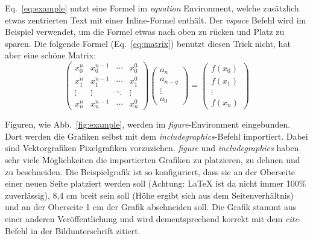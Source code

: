 \documentclass[runningheads,a4paper]{uwsese}
\begin{document}
Eq.~\ref{eq:example} nutzt eine Formel im \emph{equation} Environment, welche zusätzlich etwas zentrierten Text mit einer Inline-Formel enthält. Der \emph{vspace} Befehl wird im Beispiel verwendet, um die Formel etwas nach oben zu rücken und Platz zu sparen. Die folgende Formel (Eq.~\ref{eq:matrix}) benutzt diesen Trick nicht, hat aber eine schöne Matrix:
\begin{equation}
\begin{pmatrix}
x_0^n & x_0^{n-1} & \cdots & x_0^0 \\
x_1^n & x_1^{n-1} & \cdots & x_1^0 \\
\vdots & \vdots & \ddots & \vdots \\
x_n^n & x_n^{n-1} & \cdots & x_n^0
\end{pmatrix}
\begin{pmatrix}
a_n \\
a_{n-q} \\
\vdots\\
a_0
\end{pmatrix}
=
\begin{pmatrix}
f(x_0) \\
f(x_1) \\
\vdots\\
f(x_n)
\end{pmatrix}
\label{eq:matrix}
\end{equation}

Figuren, wie Abb.~\ref{fig:example}, werden im \emph{figure}-Environment eingebunden. Dort werden die Grafiken selbst mit dem \emph{includegraphics}-Befehl importiert. Dabei sind Vektorgrafiken Pixelgrafiken vorzuziehen. \emph{figure} und \emph{includegraphics} haben sehr viele Möglichkeiten die importierten Grafiken zu platzieren, zu dehnen und zu beschneiden. Die Beispielgrafik ist so konfiguriert, dass sie an der Oberseite einer neuen Seite platziert werden soll (Achtung: LaTeX ist da nicht immer 100\% zuverlässig), 8,4 cm breit sein soll (Höhe ergibt sich aus dem Seitenverhältnis) und an der Oberseite 1 cm der Grafik abschneiden soll. Die Grafik stammt aus einer anderen Veröffentlichung und wird dementsprechend korrekt mit dem \emph{cite}-Befehl in der Bildunterschrift zitiert.
\end{document}
